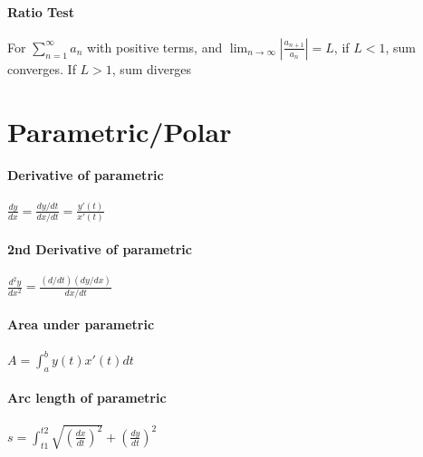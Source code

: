 \documentclass[10pt,landscape]{article}
\begin{document}
\begin{multicols}{4}
\paragraph{Ratio Test}
For $\sum_{n=1}^{\infty}a_n$  with positive terms, and $\lim_{n\rightarrow\infty}|\frac{a_{n+1}}{a_n}| = L$, if $L < 1$, sum converges. If $L > 1$, sum diverges


\section{Parametric/Polar}

\paragraph{Derivative of parametric}
$\frac{dy}{dx} = \frac{dy/dt}{dx/dt} = \frac{y'(t)}{x'(t)}$


\paragraph{2nd Derivative of parametric}
$\frac{d^2y}{dx^2} = \frac{(d/dt)(dy/dx)}{dx/dt}$

\paragraph{Area under parametric}
$A = \int_{a}^{b}y(t)x'(t)dt$


\paragraph{Arc length of parametric}
$s = \int_{t1}^{t2} \sqrt{(\frac{dx}{dt})^2}+(\frac{dy}{dt})^2$
		
	\end{multicols}
\end{document}
